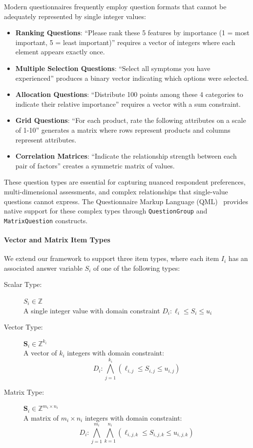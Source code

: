 Modern questionnaires frequently employ question formats that cannot be adequately represented by single integer values:

\begin{itemize}
    \item \textbf{Ranking Questions}: ``Please rank these 5 features by importance (1 = most important, 5 = least important)'' requires a vector of integers where each element appears exactly once.
    \item \textbf{Multiple Selection Questions}: ``Select all symptoms you have experienced'' produces a binary vector indicating which options were selected.
    \item \textbf{Allocation Questions}: ``Distribute 100 points among these 4 categories to indicate their relative importance'' requires a vector with a sum constraint.
    \item \textbf{Grid Questions}: ``For each product, rate the following attributes on a scale of 1-10'' generates a matrix where rows represent products and columns represent attributes.
    \item \textbf{Correlation Matrices}: ``Indicate the relationship strength between each pair of factors'' creates a symmetric matrix of values.
\end{itemize}

These question types are essential for capturing nuanced respondent preferences, multi-dimensional assessments, and complex relationships that single-value questions cannot express. The Questionnaire Markup Language (QML)~\cite{qmlsyntax} provides native support for these complex types through \texttt{QuestionGroup} and \texttt{MatrixQuestion} constructs.

\paragraph{Vector and Matrix Item Types}

We extend our framework to support three item types, where each item $I_i$ has an associated answer variable $S_i$ of one of the following types:

\begin{description}
    \item[Scalar Type:] $S_i \in \mathbb{Z}$ \\
    A single integer value with domain constraint $D_i: \ell_i \leq S_i \leq u_i$

    \item[Vector Type:] $\mathbf{S}_i \in \mathbb{Z}^{k_i}$ \\
    A vector of $k_i$ integers with domain constraint:
    \[
    D_i: \bigwedge_{j=1}^{k_i} \left(\ell_{i,j} \leq S_{i,j} \leq u_{i,j}\right)
    \]

    \item[Matrix Type:] $\mathbf{S}_i \in \mathbb{Z}^{m_i \times n_i}$ \\
    A matrix of $m_i \times n_i$ integers with domain constraint:
    \[
    D_i: \bigwedge_{j=1}^{m_i} \bigwedge_{k=1}^{n_i} \left(\ell_{i,j,k} \leq S_{i,j,k} \leq u_{i,j,k}\right)
    \]
\end{description}

